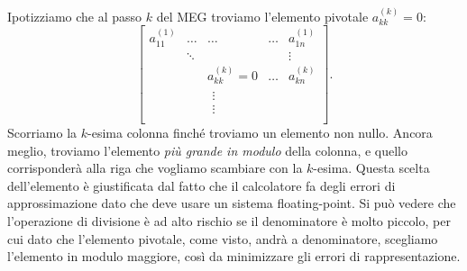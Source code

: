 Ipotizziamo che al passo $\displaystyle k$ del MEG troviamo l'elemento pivotale $\displaystyle a^{(k)}_{kk} =0$:
\begin{equation*}
\begin{bmatrix}
a^{(1)}_{11} & \dotsc  & \dotsc  & \dotsc  & a^{(1)}_{1n}\\
 & \ddots  &  &  & \vdots \\
 &  & a^{(k)}_{kk} =0 & \dotsc  & a^{(k)}_{kn}\\
 &  & \begin{array}{c}
\vdots \\
\vdots \\
\end{array} &  &
\end{bmatrix}.
\end{equation*}
Scorriamo la $k$-esima colonna finché troviamo un elemento non nullo. Ancora meglio, troviamo l'elemento \textit{più grande in modulo} della colonna, e quello corrisponderà alla riga che vogliamo scambiare con la $k$-esima.
Questa scelta dell'elemento è giustificata dal fatto che il calcolatore fa degli errori di approssimazione dato che deve usare un sistema floating-point. Si può vedere che l'operazione di divisione è ad alto rischio se il denominatore è molto piccolo, per cui dato che l'elemento pivotale, come visto, andrà a denominatore, scegliamo l'elemento in modulo maggiore, così da minimizzare gli errori di rappresentazione.

